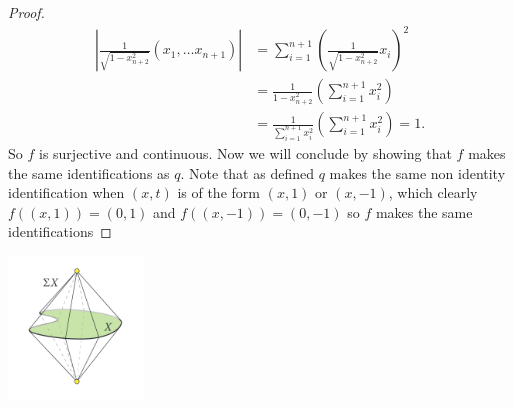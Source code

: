 \documentclass{homework651}
\begin{document}
\begin{problems}
\begin{proof}
    \begin{align*}
        \left|\frac{1}{\sqrt{1 - x_{n+2}^2}}(x_1, \dots x_{n+1})\right| &= \sum_{i = 1}^{n+1}\left(\frac{1}{\sqrt{1 - x_{n+2}^2}}x_i\right)^2\\
        &=\frac{1}{1 - x_{n+2}^2}\left(\sum_{i = 1}^{n+1}x_i^2\right)\\
        &=\frac{1}{\sum_{i = 1}^{n+1}x_i^2}\left(\sum_{i = 1}^{n+1}x_i^2\right) = 1.
    \end{align*}
    So $f$ is surjective and continuous. Now we will conclude by showing that $f$ makes the same identifications as $q$. 
    Note that as defined $q$ makes the same non identity identification when $(x, t)$ is of the form $(x, 1)$ or $(x, -1)$, which clearly $f((x, 1)) = (0,1)$ and $f((x, -1)) = (0, -1)$ so $f$ makes the same identifications
\end{proof}
\begin{center}
    \includegraphics[height=1.5in]{Suspension.png}    
\end{center}



\end{problems}
\end{document}
